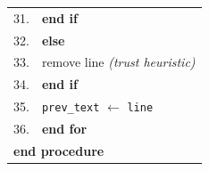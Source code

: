 \documentclass[11pt]{article}
\newcounter{procedure}
\begin{document}
\begin{figure}[H]
\begin{tabular}{l l}
31. & \quad \quad \textbf{end if} \\
32. & \quad \textbf{else} \\
33. & \quad \quad remove line \quad \textit{(trust heuristic)} \\
34. & \quad \textbf{end if} \\
35. & \quad \texttt{prev\_text} $\gets$ \texttt{line} \\
36. & \textbf{end for} \\
\multicolumn{2}{l}{\textbf{end procedure}} \\
\hline
\end{tabular}
\end{figure}

\medskip

\end{document}
